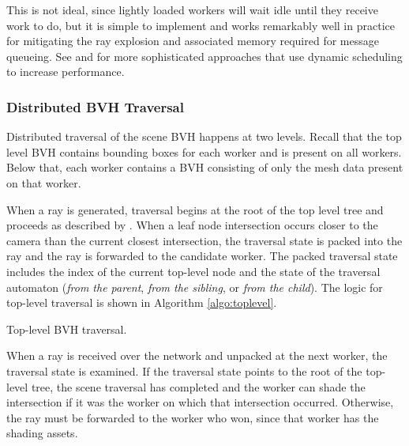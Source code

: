 \documentclass[a4paper,twoside]{article}
\begin{document}
This is not ideal, since lightly loaded workers will wait idle until they
receive work to do, but it is simple to implement and works remarkably well in
practice for mitigating the ray explosion and associated memory required for
message queueing. See \cite{reinhard:1999} and \cite{navratil:2012} for more
sophisticated approaches that use dynamic scheduling to increase performance.

\subsubsection{Distributed BVH Traversal}
\label{traversal}

Distributed traversal of the scene BVH happens at two levels. Recall that the
top level BVH contains bounding boxes for each worker and is present on all
workers. Below that, each worker contains a BVH consisting of only the mesh data
present on that worker.

When a ray is generated, traversal begins at the root of the top level tree
and proceeds as described by \cite{hapala:2011}. When a leaf node
intersection occurs closer to the camera than the current closest intersection,
the traversal state is packed into the ray and the ray is forwarded to the
candidate worker. The packed traversal state includes the index of the current
top-level node and the state of the traversal automaton (\emph{from the parent},
\emph{from the sibling}, or \emph{from the child}). The logic for top-level
traversal is shown in Algorithm \ref{algo:toplevel}.

\begin{algorithm}[h!]
    \SetAlgoLined


    \caption{Top-level BVH traversal.}
    \label{algo:toplevel}
\end{algorithm}

When a ray is received over the network and unpacked at the next worker, the traversal
state is examined. If the traversal state points to the root of the top-level
tree, the scene traversal has completed and the worker can shade the
intersection if it was the worker on which that intersection occurred.
Otherwise, the ray must be forwarded to the worker who won, since that worker has
the shading assets.
\end{document}
